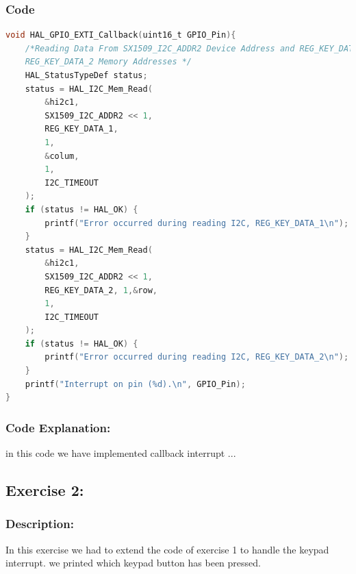 \documentclass[english]{article}
\begin{document}
\subsubsection{Code}
\begin{lstlisting}[language=C, caption={Interrupt Callback}]
void HAL_GPIO_EXTI_Callback(uint16_t GPIO_Pin){
    /*Reading Data From SX1509_I2C_ADDR2 Device Address and REG_KEY_DATA_1 and 
    REG_KEY_DATA_2 Memory Addresses */
    HAL_StatusTypeDef status;
    status = HAL_I2C_Mem_Read(
        &hi2c1,
        SX1509_I2C_ADDR2 << 1,
        REG_KEY_DATA_1,
        1,
        &colum,
        1,
        I2C_TIMEOUT
    );
    if (status != HAL_OK) {
        printf("Error occurred during reading I2C, REG_KEY_DATA_1\n");
    }
    status = HAL_I2C_Mem_Read(
        &hi2c1,
        SX1509_I2C_ADDR2 << 1,
        REG_KEY_DATA_2, 1,&row,
        1, 
        I2C_TIMEOUT
    );
    if (status != HAL_OK) {
        printf("Error occurred during reading I2C, REG_KEY_DATA_2\n");
    }
    printf("Interrupt on pin (%d).\n", GPIO_Pin);
}
\end{lstlisting}

\subsubsection{Code Explanation:}
in this code we have implemented callback interrupt ...
\newpage
\subsection{Exercise 2:}
\subsubsection{Description:}
In this exercise we had to extend the code of exercise 1 to handle the keypad interrupt. we printed which keypad button has been pressed.
\end{document}
